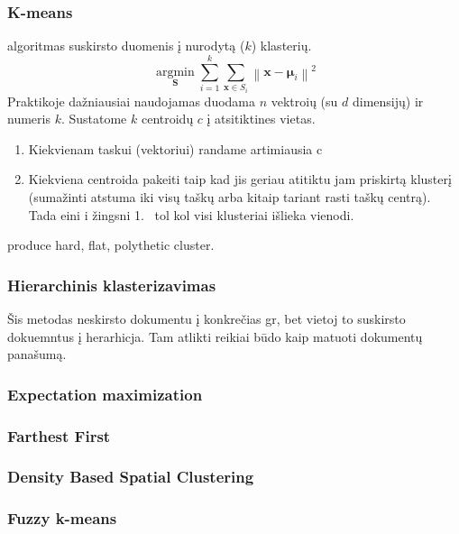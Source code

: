\documentclass{VUMIFInfKursinis}
\begin{document}
\subsubsection{K-means}
 algoritmas suskirsto duomenis į nurodytą ($ k $) klasterių. \[ \underset{\mathbf{S}} {\operatorname{\arg \min}}  \sum_{i=1}^{k} \sum_{\mathbf x \in S_i} \left\| \mathbf x - \boldsymbol\mu_i \right\|^2 \]
Praktikoje dažniausiai naudojamas duodama $n$ vektroių (su $d$ dimensijų) ir numeris $k$.  Sustatome $k$ centroidų $c$ į atsitiktines vietas.
\begin{enumerate}
	\item Kiekvienam taskui (vektoriui) randame artimiausia c
	\item Kiekviena centroida pakeiti taip kad jis geriau atitiktu jam priskirtą klusterį (sumažinti atstuma iki visų taškų arba kitaip tariant rasti taškų centrą). Tada eini i žingsni  1.\ %
	tol kol visi klusteriai išlieka vienodi.
\end{enumerate}
 produce hard, flat, polythetic cluster. 

\subsubsection{Hierarchinis klasterizavimas}
 Šis metodas neskirsto dokumentu į konkrečias gr, bet vietoj to suskirsto dokuemntus į herarhicja. Tam atlikti reikiai būdo kaip matuoti dokumentų panašumą. 


\subsubsection{Expectation maximization}
\subsubsection{Farthest First}
\subsubsection{Density Based Spatial Clustering}
\subsubsection{Fuzzy k-means}
\end{document}
